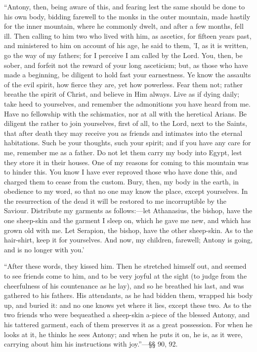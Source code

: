``Antony, then, being aware of this, and fearing lest the same
should be done to his own body, bidding farewell to the monks in the
outer mountain, made hastily for the inner mountain, where he commonly
dwelt, and after a few months, fell ill. Then calling to him two who
lived with him, as ascetics, for fifteen years past, and ministered to
him on account of his age, he said to them, 'I, as it is written, go
the way of my fathers; for I perceive I am called by the Lord. You,
then, be sober, and forfeit not the reward of your long asceticism;
but, as those who have made a beginning, be diligent to hold fast your
earnestness. Ye know the assaults of the evil spirit, how fierce they
are, yet how powerless. Fear them not; rather breathe the spirit of
Christ, and believe in Him always. Live as if dying daily; take heed
to yourselves, and remember the admonitions you have heard from me.
Have no fellowship with the schismatics, nor at all with the heretical
Arians. Be diligent the rather to join yourselves, first of all, to
the Lord, next to the Saints, that after death they may receive you as
friends and intimates into the eternal habitations. Such be your
thoughts, such your spirit; and if you have any care for me, remember
me as a father. Do not let them carry my body into Egypt, lest they
store it in their houses. One of my reasons for coming to this
mountain was to hinder this. You know I have ever reproved those who
have done this, and charged them to cease from the custom. Bury, then,
my body in the earth, in obedience to my word, so that no one may know
the place, except yourselves. In the resurrection of the dead it will
be restored to me incorruptible by the Saviour. Distribute my garments
as follows:—let Athanasius, the bishop, have the one sheep-skin and
the garment I sleep on, which he gave me new, and which has grown old
with me. Let Serapion, the bishop, have the other sheep-skin. As to
the hair-shirt, keep it for yourselves. And now, my children,
farewell; Antony is going, and is no longer with you.'

``After these words, they kissed him. Then he stretched himself
out, and seemed to see friends come to him, and to be very joyful at
the sight (to judge from the cheerfulness of his countenance as he
lay), and so he breathed his last, and was gathered to his fathers.
His attendants, as he had bidden them, wrapped
his body up, and buried it: and no one knows yet where it lies, except
these two. As to the two friends who were bequeathed a sheep-skin
a-piece of the blessed Antony, and his tattered garment, each of them
preserves it as a great possession. For when he looks at it, he thinks
he sees Antony; and when he puts it on, he is, as it were, carrying
about him his instructions with joy.''—§§ 90, 92.

